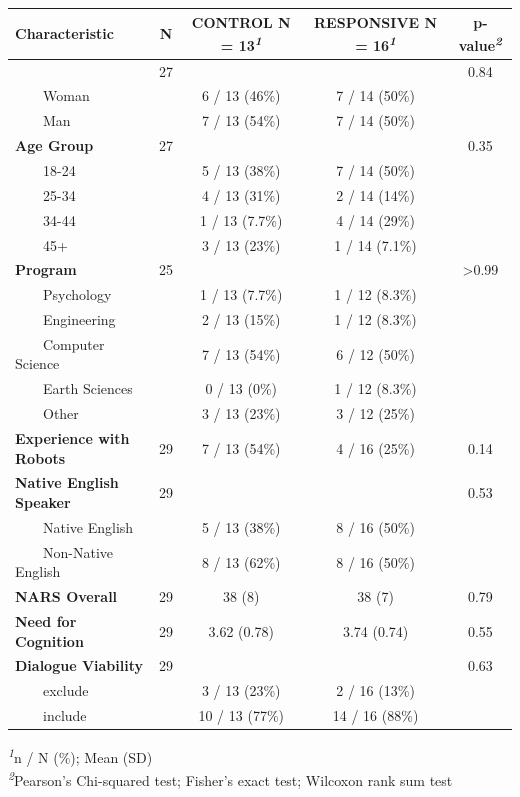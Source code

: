 \documentclass[
  authoryear,
  doubleblind,
  3p]{elsarticle}
\begin{document}
\begin{table}
{\fontsize{10.0pt}{12.0pt}\selectfont
\begin{tabular*}{\linewidth}{@{\extracolsep{\fill}}lcccc}
\toprule
\textbf{Characteristic} & \textbf{N} & \textbf{CONTROL}  N = 13\textsuperscript{\textit{1}} & \textbf{RESPONSIVE}  N = 16\textsuperscript{\textit{1}} & \textbf{p-value}\textsuperscript{\textit{2}} \\ 
\midrule\addlinespace[2.5pt]
{\bfseries Gender} & 27 &  &  & 0.84 \\ 
    Woman &  & 6 / 13 (46\%) & 7 / 14 (50\%) &  \\ 
    Man &  & 7 / 13 (54\%) & 7 / 14 (50\%) &  \\ 
{\bfseries Age Group} & 27 &  &  & 0.35 \\ 
    18-24 &  & 5 / 13 (38\%) & 7 / 14 (50\%) &  \\ 
    25-34 &  & 4 / 13 (31\%) & 2 / 14 (14\%) &  \\ 
    34-44 &  & 1 / 13 (7.7\%) & 4 / 14 (29\%) &  \\ 
    45+ &  & 3 / 13 (23\%) & 1 / 14 (7.1\%) &  \\ 
{\bfseries Program} & 25 &  &  & >0.99 \\ 
    Psychology &  & 1 / 13 (7.7\%) & 1 / 12 (8.3\%) &  \\ 
    Engineering &  & 2 / 13 (15\%) & 1 / 12 (8.3\%) &  \\ 
    Computer Science &  & 7 / 13 (54\%) & 6 / 12 (50\%) &  \\ 
    Earth Sciences &  & 0 / 13 (0\%) & 1 / 12 (8.3\%) &  \\ 
    Other &  & 3 / 13 (23\%) & 3 / 12 (25\%) &  \\ 
{\bfseries Experience with Robots} & 29 & 7 / 13 (54\%) & 4 / 16 (25\%) & 0.14 \\ 
{\bfseries Native English Speaker} & 29 &  &  & 0.53 \\ 
    Native English &  & 5 / 13 (38\%) & 8 / 16 (50\%) &  \\ 
    Non-Native English &  & 8 / 13 (62\%) & 8 / 16 (50\%) &  \\ 
{\bfseries NARS Overall} & 29 & 38 (8) & 38 (7) & 0.79 \\ 
{\bfseries Need for Cognition} & 29 & 3.62 (0.78) & 3.74 (0.74) & 0.55 \\ 
{\bfseries Dialogue Viability} & 29 &  &  & 0.63 \\ 
    exclude &  & 3 / 13 (23\%) & 2 / 16 (13\%) &  \\ 
    include &  & 10 / 13 (77\%) & 14 / 16 (88\%) &  \\ 
\bottomrule
\end{tabular*}
\begin{minipage}{\linewidth}
\textsuperscript{\textit{1}}n / N (\%); Mean (SD)\\
\textsuperscript{\textit{2}}Pearson's Chi-squared test; Fisher's exact test; Wilcoxon rank sum test\\
\end{minipage}

}

\end{table}%
\end{document}
